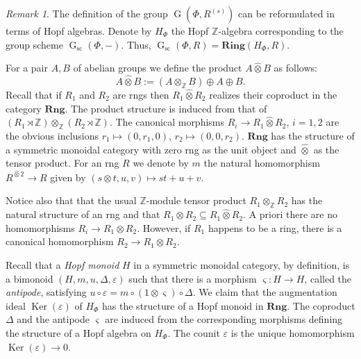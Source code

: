 \documentclass[oneside, 11pt]{amsart}
\numberwithin{equation}{section}
\theoremstyle{definition}
\theoremstyle{remark}
\newtheorem{rem}[lemma]{Remark}
\DeclareMathOperator\Ker{Ker}
\DeclareMathOperator\GG{G}
\newcommand{\Rng}{\mathbf{Rng}}
\newcommand{\ZZ}{\mathbb{Z}}
\newcommand{\otimeshat}{\mathbin{\widehat{\otimes}}}
\begin{document}
\begin{rem}
 The definition of the group $\GG(\Phi, R^{(s)})$ can be reformulated in terms of Hopf algebras. Denote by \(H_\Phi\) the Hopf \(\ZZ\)-algebra corresponding to the group scheme \(\GG_{\mathrm{sc}}(\Phi, -)\). Thus, $\GG_\mathrm{sc}(\Phi, R) = \mathbf{Ring}(H_\Phi, R)$.
 
 For a pair $A, B$ of abelian groups we define the product $A \otimeshat B$ as follows: \[A \otimeshat B := (A \otimes_{\ZZ} B) \oplus A \oplus B.\]  
 Recall that if $R_1$ and $R_2$ are rngs then $R_1 \otimeshat R_2$ realizes their coproduct in the category $\Rng$.
 The product structure is induced from that of $(R_1\rtimes\mathbb Z)\otimes_{\mathbb Z}(R_2\rtimes\mathbb Z)$. The canonical morphisms $R_i \to R_1 \otimeshat R_2$, $i=1,2$ are the obvious inclusions $r_1 \mapsto (0, r_1, 0)$, $r_2 \mapsto (0, 0, r_2)$.
 $\Rng$ has the structure of a symmetric monoidal category with zero rng as the unit object and $\otimeshat$ as the tensor product. For an rng $R$ we denote by $m$ the natural homomorphism $R^{\otimeshat 2} \to R$ given by $(s \otimes t, u, v) \mapsto st + u + v$.
 
 Notice also that that the usual $\ZZ$-module tensor product \(R_1 \otimes_{\mathbb Z} R_2\) has the natural structure of an rng and that $R_1 \otimes R_2 \subseteq R_1 \otimeshat R_2$. A priori there are no homomorphisms $R_i \to R_1 \otimes R_2$. However, if $R_1$ happens to be a ring, there is a canonical homomorphism $R_2 \to R_1 \otimes R_2$.

 
 Recall that a {\it Hopf monoid} $H$ in a symmetric monoidal category, by definition, is a bimonoid $(H, m, u, \Delta, \varepsilon)$ such that there is a morphism $\varsigma\colon H\to H$, called the {\it antipode}, satisfying $u \circ \varepsilon = m \circ (1 \otimes \varsigma) \circ \Delta$.
 We claim that the augmentation ideal \(\Ker(\varepsilon)\) of $H_\Phi$ has the structure of a Hopf monoid in \(\Rng\). The coproduct $\Delta$ and the antipode $\varsigma$ are induced from the corresponding morphisms defining the structure of a Hopf algebra on $H_\Phi$. The counit $\varepsilon$ is the unique homomorphism $\Ker(\varepsilon) \to 0$.
 

\end{rem}
\end{document}
